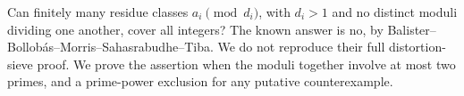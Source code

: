 Can finitely many residue classes $a_i\pmod {d_i}$, with $d_i>1$ and no distinct moduli dividing one another, cover all integers? The known answer is no, by Balister--Bollob\'as--Morris--Sahasrabudhe--Tiba. We do not reproduce their full distortion-sieve proof. We prove the assertion when the moduli together involve at most two primes, and a prime-power exclusion for any putative counterexample.
